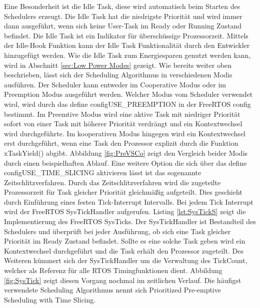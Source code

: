 Eine Besonderheit ist die Idle Task, diese wird automatisch beim Starten des Schedulers erzeugt. Die Idle Task hat die niedrigste Priorität und wird immer dann ausgeführt, wenn sich keine User-Task im Ready oder Running Zustand befindet. Die Idle Task ist ein Indikator für überschüssige Prozessorzeit. Mittels der Idle-Hook Funktion kann der Idle Task Funktionalität durch den Entwickler hinzugefügt werden. Wie die Idle Task zum Energiesparen genutzt werden kann, wird in Abschnitt \ref{sec:Low Power Modes} gezeigt. Wie bereits weiter oben beschrieben, lässt sich der Scheduling Algorithmus in verschiedenen Modis ausführen. Der Scheduler kann entweder im Cooperative Modus oder im Preemption Modus ausgeführt werden. Welcher Modus vom Scheduler verwendet wird, wird durch das define configUSE\_PREEMPTION in der FreeRTOS config bestimmt. Im Preemtive Modus wird eine aktive Task mit niedriger Priorität sofort von einer Task mit höherer Priorität verdrängt und ein Kontextwechsel wird durchgeführte. Im kooperativen Modus hingegen wird ein Kontextwechsel erst durchgeführt, wenn eine Task den Prozessor explizit durch die Funktion xTaskYield() abgibt. Abbildung \ref{fig:PreVSCo} zeigt den Vergleich beider Modis durch einen beispielhaften Ablauf. Eine weitere Option die sich über das define configUSE\_TIME\_SLICING aktivieren lässt ist das sogenannte Zeitschlitzverfahren. Durch das Zeitschlitzverfahren wird die zugeteilte Prozessorzeit für Task gleicher Priorität gleichmäßig aufgeteilt. Dies geschieht durch Einführung eines festen Tick-Interrupt Intervalls. Bei jedem Tick Interrupt wird der FreeRTOS SysTickHandler aufgerufen. Listing \ref{lst:SysTickS} zeigt die Implementierung des FreeRTOS SysTicks. Der SysTickHandler ist Bestandteil des Schedulers und überprüft bei jeder Ausführung, ob sich eine Task gleicher Priorität im Ready Zustand befindet. Sollte es eine solche Task geben wird ein Kontextwechsel durchgeführt und die Task erhält den Prozessor zugeteilt. Des Weiteren kümmert sich der SysTickHandler um die Verwaltung des TickCount, welcher als Referenz für alle RTOS Timingfunktionen dient. Abbildung \ref{fig:SysTick} zeigt diesen Vorgang nochmal im zeitlichen Verlauf. Die häufigst verwendete Scheduling Algorithmus nennt sich Prioritized Pre-emptive Scheduling with Time Slicing.
